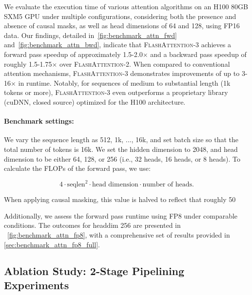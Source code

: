 \begin{enumerate}
\begin{enumerate}
\begin{itemize}
We evaluate the execution time of various attention algorithms on an H100 80GB SXM5 GPU under multiple configurations, considering both the presence and absence of causal masks, as well as head dimensions of 64 and 128, using FP16 data. Our findings, detailed in~\cref{fig:benchmark_attn_fwd} and~\cref{fig:benchmark_attn_bwd}, indicate that \textsc{FlashAttention-3} achieves a forward pass speedup of approximately 1.5-2.0$\times$ and a backward pass speedup of roughly 1.5-1.75$\times$ over \textsc{FlashAttention-2}. When compared to conventional attention mechanisms, \textsc{FlashAttention-3} demonstrates improvements of up to 3-16$\times$ in runtime. Notably, for sequences of medium to substantial length (1k tokens or more), \textsc{FlashAttention-3} even outperforms a proprietary library (cuDNN, closed source) optimized for the H100 architecture.

\paragraph{Benchmark settings:} We vary the sequence length as 512, 1k, ..., 16k, and set batch size so that the total number of tokens is 16k. We set the hidden dimension to 2048, and head dimension to be either 64, 128, or 256 (i.e., 32 heads, 16 heads, or 8 heads). To calculate the FLOPs of the forward pass, we use:

\begin{equation*}
  4 \cdot \text{seqlen}^2 \cdot \text{head dimension} \cdot \text{number of heads}.
\end{equation*}

When applying causal masking, this value is halved to reflect that roughly 50%

Additionally, we assess the forward pass runtime using FP8 under comparable conditions. The outcomes for headdim 256 are presented in ~\cref{fig:benchmark_attn_fp8}, with a comprehensive set of results provided in \cref{sec:benchmark_attn_fp8_full}.

\subsection{Ablation Study: 2-Stage Pipelining Experiments}
\label{sec:2-stage-pipelining-experiments}


\end{itemize}
\end{enumerate}
\end{enumerate}
